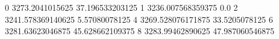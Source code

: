 0 3273.2041015625 37.196533203125
1 3236.007568359375 0.0
2 3241.578369140625 5.57080078125
4 3269.528076171875 33.5205078125
6 3281.63623046875 45.628662109375
8 3283.99462890625 47.987060546875
